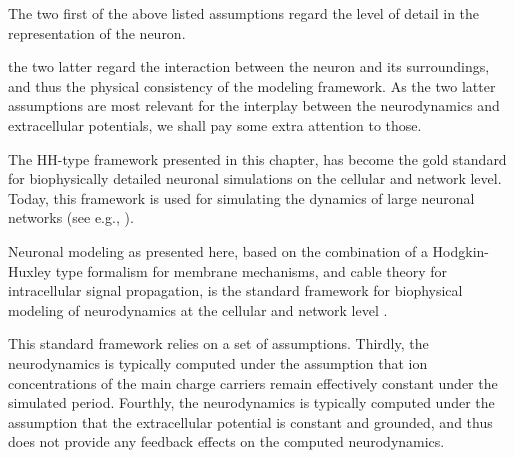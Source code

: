 The two first of the above listed assumptions regard the level of detail in the representation of the neuron.

the two latter regard the interaction between the neuron and its surroundings, and thus the physical consistency of the modeling framework. As the two latter assumptions are most relevant for the interplay between the neurodynamics and extracellular potentials, we shall pay some extra attention to those.





The HH-type framework presented in this chapter, has become the gold standard for biophysically detailed neuronal simulations on the cellular and network level. Today, this framework is used for simulating the dynamics of large neuronal networks (see e.g., \cite{traub2005, markram2015, arkhipov2018}). 









Neuronal modeling as presented here, based on the combination of a Hodgkin-Huxley type formalism for membrane mechanisms, and cable theory for intracellular signal propagation, is the standard framework for biophysical modeling of neurodynamics at the cellular and network level  . 

This standard framework relies on a set of assumptions.  Thirdly, the neurodynamics is typically computed under the assumption that ion concentrations of the main charge carriers remain effectively constant under the simulated period. Fourthly, the neurodynamics is typically computed under the assumption that the extracellular potential is constant and grounded, and thus does not provide any feedback effects on the computed neurodynamics. 




